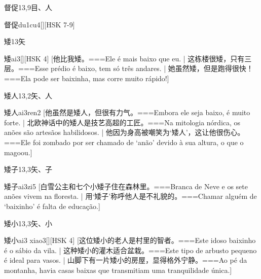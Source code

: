 \begin{Entry}{督促}{13,9}{⽬、⼈}
  \begin{Phonetics}{督促}{du1cu4}[][HSK 7-9]
  \end{Phonetics}
\end{Entry}

\begin{Entry}{矮}{13}{⽮}
  \begin{Phonetics}{矮}{ai3}[][HSK 4]
    [他比我矮。===Ele é mais baixo que eu. | 这栋楼很矮，只有三层。===Esse prédio é baixo, tem só três andares. | 她虽然矮，但是跑得很快！===Ela pode ser baixinha, mas corre muito rápido!]
  \end{Phonetics}
\end{Entry}

\begin{Entry}{矮人}{13,2}{⽮、⼈}
  \begin{Phonetics}{矮人}{ai3ren2}
    [他虽然是矮人，但很有力气。===Embora ele seja baixo, é muito forte. | 北欧神话中的矮人是技艺高超的工匠。===Na mitologia nórdica, os anões são artesãos habilidosos. | 他因为身高被嘲笑为‘矮人’，这让他很伤心。===Ele foi zombado por ser chamado de ‘anão’ devido à sua altura, o que o magoou.]
  \end{Phonetics}
\end{Entry}

\begin{Entry}{矮子}{13,3}{⽮、⼦}
  \begin{Phonetics}{矮子}{ai3zi5}
    [白雪公主和七个小矮子住在森林里。===Branca de Neve e os sete anões vivem na floresta. | 用`矮子'称呼他人是不礼貌的。===Chamar alguém de `baixinho' é falta de educação.]
  \end{Phonetics}
\end{Entry}

\begin{Entry}{矮小}{13,3}{⽮、⼩}
  \begin{Phonetics}{矮小}{ai3 xiao3}[][HSK 4]
    [这位矮小的老人是村里的智者。===Este idoso baixinho é o sábio da vila. | 这种矮小的灌木适合盆栽。===Este tipo de arbusto pequeno é ideal para vasos. | 山脚下有一片矮小的房屋，显得格外宁静。===Ao pé da montanha, havia casas baixas que transmitiam uma tranquilidade única.]
  \end{Phonetics}
\end{Entry}


